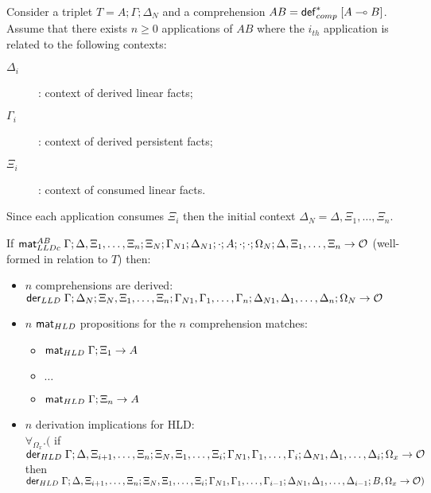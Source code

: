 \begin{lemma}\label{thm:comprehension}
Consider a triplet $T = A; \Gamma; \Delta_{N}$ and a comprehension $AB =
\mathsf{def}_{comp}^{*} \; [A \multimap B]$. Assume that there exists $n \geq 0$ applications of $AB$
where the $i_{th}$ application is related to the following contexts:
\begin{description}
   \item[$\Delta_i$]: context of derived linear facts;
   \item[$\Gamma_i$]: context of derived persistent facts;
   \item[$\Xi_i$]: context of consumed linear facts.
\end{description}

Since each application consumes $\Xi_i$ then the initial context $\Delta_N =
\Delta, \Xi_1, \dotsc, \Xi_n$.

If $\mathsf{mat}_{LLDc}^{AB} \; \Gamma; \Delta, \Xi_1, \dotsc, \Xi_n;
\Xi_N; \Gamma_{N1}; \Delta_{N1}; \cdot; A; \cdot; \cdot; \Omega_N;
\Delta, \Xi_1, \dotsc, \Xi_n \rightarrow \mathcal{O}$ (well-formed in
relation to $T$) then:

\begin{itemize}[leftmargin=*]
   \item $n$ comprehensions are derived:\\
   $\mathsf{der}_{LLD} \; \Gamma; \Delta_N; \Xi_N, \Xi_1, \dotsc, \Xi_n; \Gamma_{N1},
   \Gamma_1, \dotsc, \Gamma_n; \Delta_{N1}, \Delta_1, \dotsc, \Delta_n; \Omega_N \rightarrow \mathcal{O}$
   \item $n$ $\mathsf{mat}_{HLD} \;$propositions for the $n$ comprehension matches:
   \begin{itemize}[leftmargin=\secondm]
      \item $\mathsf{mat}_{HLD} \; \Gamma; \Xi_1 \rightarrow A$
      \item $\dots$
      \item $\mathsf{mat}_{HLD} \; \Gamma; \Xi_n \rightarrow A$
   \end{itemize}
   \item $n$ derivation implications for HLD: \\
   $\forall_{\Omega_x}.($ if $\mathsf{der}_{HLD} \; \Gamma; \Delta, \Xi_{i+1}, \dotsc, \Xi_n; \Xi_N, \Xi_1,
         \dotsc, \Xi_i; \Gamma_{N1}, \Gamma_1, \dotsc, \Gamma_i; \Delta_{N1},
         \Delta_1, \dotsc, \Delta_i; \Omega_x \rightarrow \mathcal{O}$ then $\mathsf{der}_{HLD} \; \Gamma; \Delta, \Xi_{i+1}, \dotsc, \Xi_n; \Xi_N, \Xi_1,
         \dotsc,
         \Xi_i; \Gamma_{N1}, \Gamma_1, \dotsc, \Gamma_{i-1}; \Delta_{N1},
         \Delta_1, \dotsc, \Delta_{i-1}; B, \Omega_x \rightarrow \mathcal{O})$
\end{itemize}
\end{lemma}

